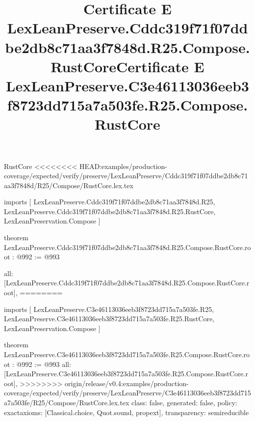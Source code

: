 \begin{lexlean}{RustCore}
<<<<<<<< HEAD:examples/production-coverage/expected/verify/preserve/LexLeanPreserve/Cddc319f71f07ddbe2db8c71aa3f7848d/R25/Compose/RustCore.lex.tex
\title{Certificate E LexLeanPreserve.Cddc319f71f07ddbe2db8c71aa3f7848d.R25.Compose.RustCore}
\begin{coremodule}
imports [
  LexLeanPreserve.Cddc319f71f07ddbe2db8c71aa3f7848d.R25,
  LexLeanPreserve.Cddc319f71f07ddbe2db8c71aa3f7848d.R25.RustCore,
  LexLeanPreservation.Compose
]

theorem LexLeanPreserve.Cddc319f71f07ddbe2db8c71aa3f7848d.R25.Compose.RustCore.root : @992 := @993 {
  all: [LexLeanPreserve.Cddc319f71f07ddbe2db8c71aa3f7848d.R25.Compose.RustCore.root],
========
\title{Certificate E LexLeanPreserve.C3e46113036eeb3f8723dd715a7a503fe.R25.Compose.RustCore}
\begin{coremodule}
imports [
  LexLeanPreserve.C3e46113036eeb3f8723dd715a7a503fe.R25,
  LexLeanPreserve.C3e46113036eeb3f8723dd715a7a503fe.R25.RustCore,
  LexLeanPreservation.Compose
]

theorem LexLeanPreserve.C3e46113036eeb3f8723dd715a7a503fe.R25.Compose.RustCore.root : @992 := @993 {
  all: [LexLeanPreserve.C3e46113036eeb3f8723dd715a7a503fe.R25.Compose.RustCore.root],
>>>>>>>> origin/release/v0.4:examples/production-coverage/expected/verify/preserve/LexLeanPreserve/C3e46113036eeb3f8723dd715a7a503fe/R25/Compose/RustCore.lex.tex
  class: false,
  generated: false,
  policy: exact{axioms: [Classical.choice, Quot.sound, propext]},
  transparency: semireducible
}


\end{coremodule}}
\end{coremodule}
\end{lexlean}
